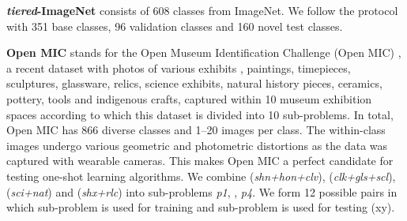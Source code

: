 \vspace{0.05cm}
\noindent\textbf{\textit{tiered}-ImageNet} \cite{ren18fewshotssl} consists of 608 classes from ImageNet. We follow the protocol with 351 base classes, 96 validation classes and 160 novel test classes.

\vspace{0.05cm}
\noindent\textbf{Open MIC} stands for the Open Museum Identification Challenge (Open MIC) \cite{me_museum}, a recent dataset with photos of various exhibits \eg, paintings, timepieces, sculptures, glassware, relics, science exhibits, natural history pieces, ceramics, pottery, tools and indigenous crafts, captured within 10 museum exhibition spaces according to which this dataset is divided into 10 sub-problems. In total, Open MIC has 866 diverse classes and 1--20 images per class. The within-class images undergo various geometric and photometric distortions as the data was captured with wearable cameras. This makes Open MIC a perfect candidate for testing one-shot learning algorithms. We combine ({\em shn+hon+clv}), ({\em clk+gls+scl}), ({\em sci+nat}) and ({\em shx+rlc}) into sub-problems {\em p1}, , {\em p4}. We form 12 possible pairs in which sub-problem  is used for training and sub-problem  is used for testing (xy).

